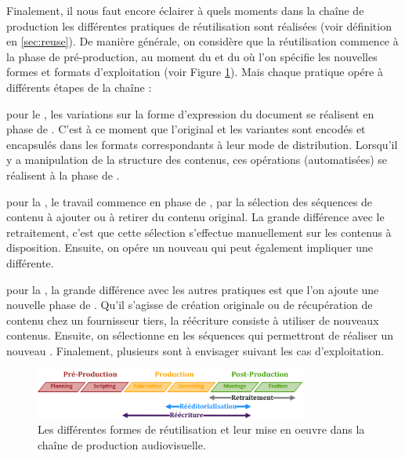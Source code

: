 Finalement, il nous faut encore éclairer à quels moments dans la chaîne de production les différentes pratiques de réutilisation sont réalisées (voir définition en \ref{sec:reuse}).
De manière générale, on considère que la réutilisation commence à la phase de pré-production, au moment du  et du  où l'on spécifie les nouvelles formes et formats d'exploitation (voir Figure \ref{img:intro:reutilisation}). 
Mais chaque pratique opére à différents étapes de la chaîne :
\begin{liste}
	\item pour le , les variations sur la forme d'expression du document se réalisent en phase de . 
	C'est à ce moment que l'original et les variantes sont encodés et encapsulés dans les formats correspondants à leur mode de distribution. 
	Lorsqu'il y a manipulation de la structure des contenus, ces opérations (automatisées) se réalisent à la phase de .

	\item pour la , le travail commence en phase de , par la sélection des séquences de contenu à ajouter ou à retirer du contenu original. 
	La grande différence avec le retraitement, c'est que cette sélection s'effectue manuellement sur les contenus à disposition. 
	Ensuite, on opére un nouveau  qui peut également impliquer une  différente.

	\item pour la , la grande différence avec les autres pratiques est que l'on ajoute une nouvelle phase de . 
	Qu'il s'agisse de création originale ou de récupération de contenu chez un fournisseur tiers, la réécriture consiste à utiliser de nouveaux contenus. 
	Ensuite, on sélectionne en  les séquences qui permettront de réaliser un nouveau . 
	Finalement, plusieurs  sont à envisager suivant les cas d'exploitation.
\end{liste}

\begin{figure}[ht!]
\centering
\includegraphics[width=0.8\textwidth]{images/Workflow-Reuse-v1.png}
\caption{Les différentes formes de réutilisation et leur mise en oeuvre dans la chaîne de production audiovisuelle.}
\label{img:intro:reutilisation}
\end{figure}
